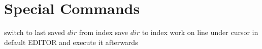 \section{Special Commands}{}
	{switch to last saved $dir$ from index}
	{save $dir$ to index}   %
	{work on line under cursor in default EDITOR and execute it afterwards}

